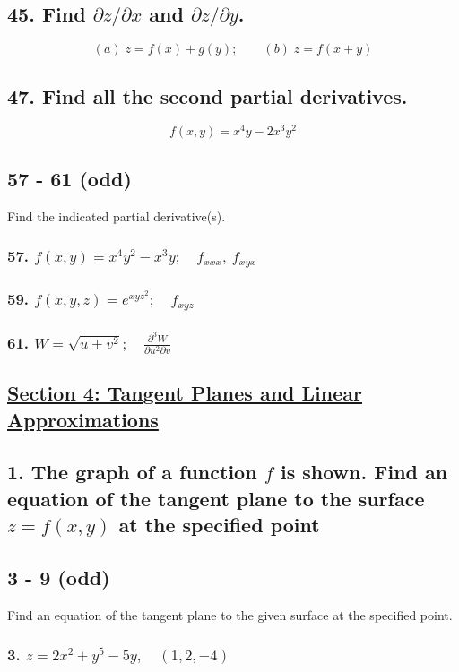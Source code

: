 \documentclass{article}
\begin{document}
\subsection*{45. Find $\partial z / \partial x$ and $\partial z / \partial y$.}
\[
    (a)\; z = f(x) + g(y); \qquad (b)\; z = f(x + y) 
\]
\subsection*{47. Find all the second partial derivatives.}
\[
    f(x,y) = x^4y - 2x^3y^2
\]
\subsection*{57 - 61 (odd)}
Find the indicated partial derivative(s).
\subsubsection*{57. $f(x,y) = x^4y^2 - x^3y;\quad f_{xxx},\: f_{xyx}$}
\subsubsection*{59. $f(x,y,z) = e^{xyz^2}; \quad f_{xyz}$}
\subsubsection*{61. $W = \sqrt{u + v^2}; \quad \displaystyle\frac{\partial^3 W}{\partial u^2 \partial v}$}
\newpage
\begin{center}
    \section*{\underline{Section 4: Tangent Planes and Linear Approximations}}
\end{center}
\subsection*{1. The graph of a function $f$ is shown. Find an equation of the tangent plane to the surface $z = f(x,y)$ at the specified point}
\subsection*{3 - 9 (odd)}
Find an equation of the tangent plane to the given surface at the specified point.
\subsubsection*{3. $z = 2x^2 + y^5 - 5y, \quad (1, 2, -4)$}
\end{document}
